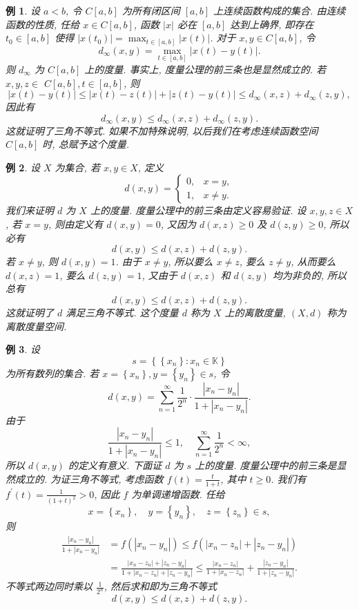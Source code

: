 \documentclass[openany]{ctexbook}
\theoremstyle{kaiti}
\theoremstyle{normal}
\newtheorem{example}{例}[section]
\begin{document}
\begin{example}
  设 $a<b$, 令 $C[a, b]$ 为所有闭区间 $[a, b]$ 上连续函数构成的集合. 由连续函数的性质, 任给 $x \in C[a, b]$, 函数 $|x|$ 必在 $[a, b]$ 达到上确界, 即存在 $t_0 \in[a, b]$ 使得 $\left|x\left(t_0\right)\right|=\max_{t \in[a, b]}|x(t)|$. 对于 $x, y \in C[a, b]$, 令
  $$
  d_{\infty}(x, y)=\max_{t \in[a, b]}|x(t)-y(t)|.
  $$
  则 $d_{\infty}$ 为 $C[a, b]$ 上的度量. 事实上, 度量公理的前三条也是显然成立的. 若 $x, y, z \in$ $C[a, b], t \in[a, b]$, 则
  $$
  |x(t)-y(t)| \leqslant|x(t)-z(t)|+|z(t)-y(t)| \leqslant d_{\infty}(x, z)+d_{\infty}(z, y),
  $$
  因此有
  $$
  d_{\infty}(x, y) \leqslant d_{\infty}(x, z)+d_{\infty}(z, y).
  $$
  这就证明了三角不等式. 如果不加特殊说明, 以后我们在考虑连续函数空间 $C[a, b]$ 时, 总赋予这个度量.
\end{example}

\begin{example}
  设 $X$ 为集合, 若 $x, y \in X$, 定义
  $$
  d(x, y)= \begin{cases}0, & x=y, \\ 1, & x \neq y.\end{cases}
  $$
  我们来证明 $d$ 为 $X$ 上的度量. 度量公理中的前三条由定义容易验证. 设 $x, y, z \in X$, 若 $x=y$, 则由定义有 $d(x, y)=0$, 又因为 $d(x, z) \geqslant 0$ 及 $d(z, y) \geqslant 0$, 所以必有
  $$
  d(x, y) \leqslant d(x, z)+d(z, y).
  $$
  若 $x \neq y$, 则 $d(x, y)=1$. 由于 $x \neq y$, 所以要么 $x \neq z$, 要么 $z \neq y$, 从而要么 $d(x, z)=1$, 要么 $d(z, y)=1$, 又由于 $d(x, z)$ 和 $d(z, y)$ 均为非负的, 所以总有
  $$
  d(x, y) \leqslant d(x, z)+d(z, y).
  $$
  这就证明了 $d$ 满足三角不等式. 这个度量 $d$ 称为 $X$ 上的离散度量, $(X, d)$ 称为离散度量空间.
\end{example}

\begin{example}
  设
  $$
  s=\left\{\left\{x_n\right\}: x_n \in \mathbb{K}\right\}
  $$
  为所有数列的集合. 若 $x=\left\{x_n\right\}, y=\left\{y_n\right\} \in s$, 令
  $$
  d(x, y)=\sum_{n=1}^{\infty} \frac{1}{2^n} \cdot \frac{\left|x_n-y_n\right|}{1+\left|x_n-y_n\right|}.
  $$
  由于
  $$
  \frac{\left|x_n-y_n\right|}{1+\left|x_n-y_n\right|} \leqslant 1, \quad \sum_{n=1}^{\infty} \frac{1}{2^n}<\infty,
  $$
  所以 $d(x, y)$ 的定义有意义. 下面证 $d$ 为 $s$ 上的度量. 度量公理中的前三条是显然成立的. 为证三角不等式, 考虑函数 $f(t)=\frac{t}{1+t}$, 其中 $t \geqslant 0$. 我们有 $f^{\prime}(t)=\frac{1}{(1+t)^2}>0$, 因此 $f$ 为单调递增函数. 任给
  $$
  x=\left\{x_n\right\}, \quad y=\left\{y_n\right\}, \quad z=\left\{z_n\right\} \in s,
  $$
  则
  $$
  \begin{aligned}
  \frac{\left|x_n-y_n\right|}{1+\left|x_n-y_n\right|} &=f\left(\left|x_n-y_n\right|\right) \leqslant f\left(\left|x_n-z_n\right|+\left|z_n-y_n\right|\right) \\
  &=\frac{\left|x_n-z_n\right|+\left|z_n-y_n\right|}{1+\left|x_n-z_n\right|+\left|z_n-y_n\right|} \leqslant \frac{\left|x_n-z_n\right|}{1+\left|x_n-z_n\right|}+\frac{\left|z_n-y_n\right|}{1+\left|z_n-y_n\right|}.
  \end{aligned}
  $$
  不等式两边同时乘以 $\frac{1}{2^n}$, 然后求和即为三角不等式
  $$
  d(x, y) \leqslant d(x, z)+d(z, y).
  $$
\end{example}
\end{document}
